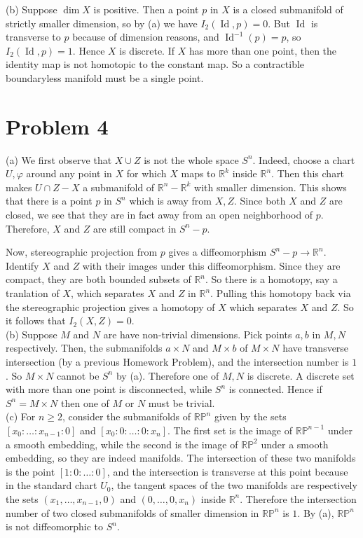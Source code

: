 \documentclass{amsart}
\numberwithin{equation}{section}
\theoremstyle{plain}
\theoremstyle{definition}
\theoremstyle{remark}
\newcommand{\Id}{\operatorname{Id}}
\renewcommand{\_}[2]{\underbrace{#1}_{#2}}
\renewcommand{\^}[2]{\overbrace{#1}_{#2}}
\newcommand{\R}{\mathbb{R}}
\renewcommand{\P}{\mathbb{P}}
\begin{document}
(b) Suppose $\dim X$ is positive. Then a point $p$ in $X$ is a closed submanifold of strictly smaller dimension, so by (a) we have $I_2(\Id, p) = 0$. But $\Id$ is transverse to $p$ because of dimension reasons, and $\Id^{-1}(p) = p$, so $I_2(\Id, p) = 1$. Hence $X$ is discrete. If $X$ has more than one point, then the identity map is not homotopic to the constant map. So a contractible boundaryless manifold must be a single point.

\section*{Problem 4}

(a) We first observe that $X\cup Z$ is not the whole space $S^n$. Indeed, choose a chart $U, \varphi$ around any point in $X$ for which $X$ maps to $\R^k$ inside $\R^n$. Then this chart makes $U\cap Z - X$ a submanifold of $\R^n - \R^k$ with smaller dimension. This shows that there is a point $p$ in $S^n$ which is away from $X, Z$. Since both $X$ and $Z$ are closed, we see that they are in fact away from an open neighborhood of $p$. Therefore, $X$ and $Z$ are still compact in $S^n - p$.

Now, stereographic projection from $p$ gives a diffeomorphism $S^n - p \to \R^n$. Identify $X$ and $Z$ with their images under this diffeomorphism. Since they are compact, they are both bounded subsets of $\R^n$. So there is a homotopy, say a tranlation of $X$, which separates $X$ and $Z$ in $\R^n$. Pulling this homotopy back via the stereographic projection gives a homotopy of $X$ which separates $X$ and $Z$. So it follows that $I_2(X,Z) = 0$.\\

(b) Suppose $M$ and $N$ are have non-trivial dimensions. Pick points $a, b$ in $M,N$ respectively. Then, the submanifolds $a\times N$ and $M\times b$ of $M\times N$ have transverse intersection (by a previous Homework Problem), and the intersection number is $1$. So $M\times N$ cannot be $S^n$ by (a). Therefore one of $M,N$ is discrete. A discrete set with more than one point is disconnected, while $S^n$ is connected. Hence if $S^n = M\times N$ then one of $M$ or $N$ must be trivial.\\

(c) For $n \geq 2$, consider the submanifolds of $\R\P^n$ given by the sets $[x_0: \dots: x_{n-1} :0]$ and $[x_0: 0 :\dots : 0 : x_n]$. The first set is the image of $\R\P^{n-1}$ under a smooth embedding, while the second is the image of $\R\P^2$ under a smooth embedding, so they are indeed manifolds. The intersection of these two manifolds is the point $[1: 0: \dots : 0]$, and the intersection is transverse at this point because in the standard chart $U_0$, the tangent spaces of the two manifolds are respectively the sets $(x_1,\dots,x_{n-1}, 0)$ and $(0,\dots, 0, x_n)$ inside $\R^n$. Therefore the intersection number of two closed submanifolds of smaller dimension in $\R\P^n$ is $1$. By (a), $\R\P^n$ is not diffeomorphic to $S^n$.
\end{document}
